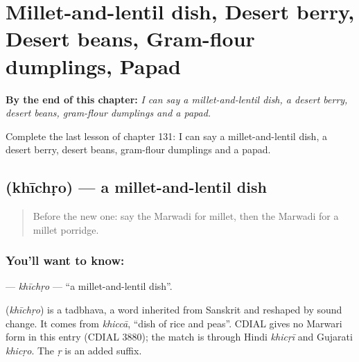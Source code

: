 
\chapter{Millet-and-lentil dish, Desert berry, Desert beans, Gram-flour dumplings, Papad}
\label{ch:mw-millet-and-lentil-dish-desert-berry-desert-beans-gram-flour-dumplings-papad}

\begin{chapteropening}
\textbf{By the end of this chapter:} \emph{I can say a millet-and-lentil dish, a desert berry, desert beans, gram-flour dumplings and a papad.}

Complete the last lesson of chapter 131: I can say a millet-and-lentil dish, a desert berry, desert beans, gram-flour dumplings and a papad.
\end{chapteropening}

\section[\texorpdfstring{\mw{खीचड़ो} (khīchṛo)}{खीचड़ो (khīchṛo)}]{ (khīchṛo) — a millet-and-lentil dish}

\label{lesson:MW-C131-khichro}



\begin{quote}
Before the new one: say the Marwadi for millet, then the Marwadi for a millet porridge.
\end{quote}

\subsection*{You'll want to know: }
\textbf{} — \emph{khīchṛo} — \textquotedblleft{}a millet-and-lentil dish\textquotedblright{}.

\begin{cousinweb}
\textbf{} (\emph{khīchṛo}) is a tadbhava, a word inherited from Sanskrit and reshaped by sound change. It comes from \emph{khiccā}, \textquotedblleft{}dish of rice and peas\textquotedblright{}. CDIAL gives no Marwari form in this entry (CDIAL 3880); the match is through Hindi \emph{khicṛī} and Gujarati \emph{khicṛo}. The \emph{ṛ} is an added suffix.
\end{cousinweb}

